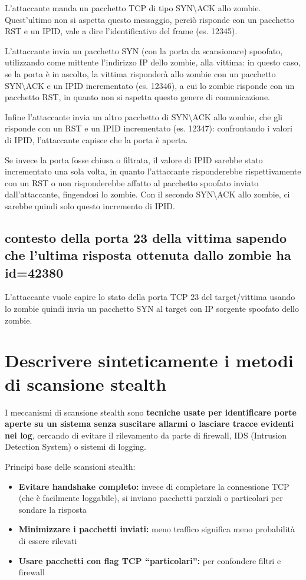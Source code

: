 \documentclass{report}
\begin{document}
\noindent L'attaccante manda un pacchetto TCP di tipo SYN\textbackslash ACK allo zombie. Quest'ultimo non si aspetta questo messaggio, perciò risponde con un pacchetto RST e un IPID, vale a dire l'identificativo del frame (es. 12345).

\noindent L'attaccante invia un pacchetto SYN (con la porta da scansionare) spoofato, utilizzando come mittente l'indirizzo IP dello zombie, alla vittima: in questo caso, se la porta è in ascolto, la vittima risponderà 
allo zombie con un pacchetto SYN\textbackslash ACK e un IPID incrementato (es. 12346), a cui lo zombie risponde con un pacchetto RST, in quanto non si aspetta questo genere di comunicazione.

\noindent Infine l'attaccante invia un altro pacchetto di SYN\textbackslash ACK allo zombie, che gli risponde con un RST e un IPID incrementato (es. 12347): confrontando i valori di IPID, l'attaccante capisce che la porta è aperta.

\noindent Se invece la porta fosse chiusa o filtrata, il valore di IPID sarebbe stato incrementato una sola volta, in quanto l'attaccante risponderebbe rispettivamente con un RST o non risponderebbe affatto al pacchetto 
spoofato inviato dall'attaccante, fingendosi lo zombie. 
Con il secondo SYN\textbackslash ACK allo zombie, ci sarebbe quindi solo questo incremento di IPID.

\subsection{contesto della porta 23 della vittima sapendo che l'ultima risposta ottenuta dallo zombie ha id=42380}
L'attaccante vuole capire lo stato della porta TCP 23 del target/vittima usando lo zombie
quindi invia un pacchetto SYN al target con IP sorgente spoofato dello zombie.

\section{ Descrivere sinteticamente i metodi di scansione stealth}
\noindent I meccanismi di scansione stealth sono \textbf{tecniche usate per identificare porte aperte su un sistema senza suscitare allarmi o lasciare tracce evidenti nei log}, cercando di evitare il rilevamento da parte di firewall, IDS (Intrusion Detection System) o sistemi di logging.

\noindent Principi base delle scansioni stealth:
\begin{itemize}
    \item \textbf{Evitare handshake completo:} invece di completare la connessione TCP (che è facilmente loggabile), si inviano pacchetti parziali o particolari per sondare la risposta
    \item \textbf{Minimizzare i pacchetti inviati:} meno traffico significa meno probabilità di essere rilevati
    \item \textbf{Usare pacchetti con flag TCP “particolari”:} per confondere filtri e firewall
\end{itemize}
\end{document}
